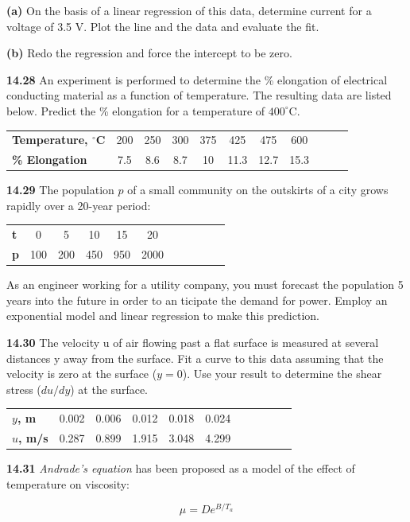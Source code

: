 \documentclass[../main.tex]{subfiles}
\begin{document}
\begin{multicols}{2}
	\noindent \textbf{(a)} On the basis of a linear regression of this data, determine
current for a voltage of 3.5 V. Plot the line and the data
and evaluate the fit.

\noindent \textbf{(b)} Redo the regression and force the intercept to be zero.

	\noindent\textbf{14.28} An experiment is performed to determine the \% elongation of electrical conducting material as a function of temperature. The resulting data are listed below. Predict the \%
	elongation for a temperature of $400^\circ$C.

	\noindent \begin{tabular}{l c c c c c c c c c c}
		\textbf{Temperature, $^\circ$C} & 200 & 250 & 300 & 375 & 425 & 475 & 600 \\
		\textbf{\% Elongation} & 7.5 & 8.6 & 8.7 & 10 & 11.3 & 12.7 & 15.3
	\end{tabular}

	\noindent\textbf{14.29} The population $p$ of a small community on the outskirts of a city grows rapidly over a 20-year period:

	\noindent \begin{tabular}{l c c c c c c c c c c}
		\textbf{t} & 0 & 5 & 10 & 15 & 20 \\
		\textbf{p} & 100 & 200 & 450 & 950 & 2000
	\end{tabular}

	\noindent As an engineer working for a utility company, you must
	forecast the population 5 years into the future in order to an	ticipate the demand for power. Employ an exponential
	model and linear regression to make this prediction.

	\noindent\textbf{14.30} The velocity u of air flowing past a flat surface is
	measured at several distances y away from the surface. Fit a
	curve to this data assuming that the velocity is zero at the
	surface ($y = 0$). Use your result to determine the shear stress
	($du/dy$) at the surface.

	\noindent \begin{tabular}{l c c c c c c c c c c}
		\textbf{$y$, m} & 0.002 & 0.006 & 0.012 & 0.018 & 0.024 \\
		\textbf{$u$, m/s} & 0.287 & 0.899 & 1.915 & 3.048 & 4.299
	\end{tabular}

	\noindent\textbf{14.31} \textit{Andrade's equation} has been proposed as a model of the effect of temperature on viscosity:

	$$ \mu = De^{B/T_a}$$


\end{multicols}
\end{document}
